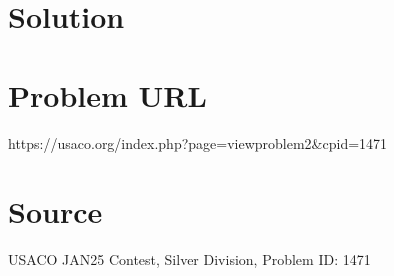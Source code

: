 \documentclass[12pt]{article}
\begin{document}
\section*{Solution}


\section*{Problem URL}
https://usaco.org/index.php?page=viewproblem2&cpid=1471

\section*{Source}
USACO JAN25 Contest, Silver Division, Problem ID: 1471
\end{document}
